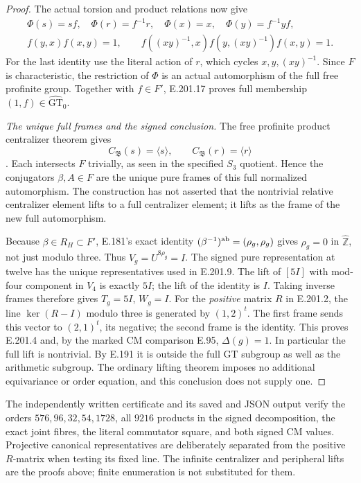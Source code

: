 \begin{proof}
The actual torsion and product relations now give
\[
 \begin{gathered}
 \Phi(s)=sf,\quad \Phi(r)=f^{-1}r,\quad
 \Phi(x)=x,\quad \Phi(y)=f^{-1}yf,\\
 f(y,x)f(x,y)=1,\qquad
 f((xy)^{-1},x)f(y,(xy)^{-1})f(x,y)=1.
 \end{gathered}
\tag{E.201.17}
\]
For the last identity use the literal action of \(r\), which
cycles \(x,y,(xy)^{-1}\).  Since \(F\) is characteristic,
the restriction of \(\Phi\) is an actual automorphism of
the full free profinite group.  Together with \(f\in F'\),
E.201.17 proves full membership \((1,f)\in\widehat{\mathrm{GT}}_0\).

\emph{The unique full frames and the signed conclusion.}
The free profinite product centralizer theorem gives
\[
 C_{\mathfrak B}(s)=\langle s\rangle,\qquad
 C_{\mathfrak B}(r)=\langle r\rangle
\]
\citep[Theorem B', \S4, pp.159--160]{SymHerfortRibes1985}.
Each intersects \(F\) trivially, as seen in the specified
\(S_3\) quotient.  Hence the conjugators \(\beta,A\in F\)
are the unique pure frames of this full normalized automorphism.
The construction has not asserted that the nontrivial relative
centralizer element lifts to a full centralizer element; it lifts
as the frame of the new full automorphism.

Because \(\beta\in R_H\subset F'\), E.181's exact identity
\((\beta^{-1})^{\rm ab}=(\rho_g,\rho_g)\) gives
\(\rho_g=0\) in \(\widehat{\mathbb Z}\), not just modulo
three.  Thus \(V_g=U^{8\rho_g}=I\).  The signed pure
representation at twelve has the unique representatives used
in E.201.9.  The lift of \([5I]\) with mod-four component in
\(V_4\) is exactly \(5I\); the lift of the identity is \(I\).
Taking inverse frames therefore gives \(T_g=5I\), \(W_g=I\).
For the \emph{positive} matrix \(R\) in E.201.2, the line
\(\ker(R-I)\) modulo three is generated by \((1,2)^t\).
The first frame sends this vector to \((2,1)^t\), its negative;
the second frame is the identity.  This proves E.201.4 and,
by the marked CM comparison E.95, \(\Delta(g)=1\).
In particular the full lift is nontrivial.  By E.191 it is
outside the full GT subgroup as well as the arithmetic subgroup.
The ordinary lifting theorem imposes no additional equivariance
or order equation, and this conclusion does not supply one.
\end{proof}

The independently written certificate
 and its saved
 and JSON output verify the
orders \(576,96,32,54,1728\), all \(9216\) products in the
signed decomposition, the exact joint fibres, the literal
commutator square, and both signed CM values.  Projective
canonical representatives are deliberately separated from the
positive \(R\)-matrix when testing its fixed line.  The infinite
centralizer and peripheral lifts are the proofs above; finite
enumeration is not substituted for them.
